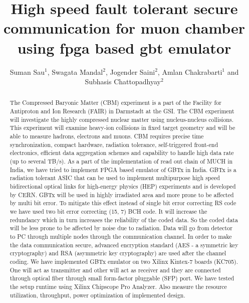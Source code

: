 \documentclass[a4paper]{jpconf}
\begin{document}
\title{High speed fault tolerant secure communication for muon
chamber using fpga based gbt emulator}

\author[1]{Suman Sau$^{1}$, Swagata Mandal$^{2}$, Jogender Saini$^{2}$, Amlan Chakrabarti$^{1}$ and Subhasis Chattopadhyay$^{2}$}
\address{$^{1}$A.K Choudhury School of IT, University of Calcutta $^{2}$Variable Energy Cyclotron Centre, Kolkata, India}

\vspace{-1 pc}
\begin{abstract}
The Compressed Baryonic Matter (CBM) experiment is a part of the Facility for Antiproton and Ion Research (FAIR) in Darmstadt at the GSI. The CBM experiment will investigate the highly compressed nuclear matter using nucleus-nucleus collisions. This experiment will examine heavy-ion collisions in fixed target geometry and will be able to measure hadrons, electrons and muons. CBM requires precise time synchronization, compact hardware, radiation tolerance, self-triggered front-end electronics, efficient data aggregation schemes and capability to handle high data rate (up to several TB/s). 
As a part of the implementation of read out chain of MUCH in India, we have tried to implement FPGA based emulator of GBTx in India. GBTx is a radiation tolerant ASIC that can be used to implement multipurpose high speed bidirectional optical links for high-energy physics (HEP) experiments and is developed by CERN. 
GBTx will be used in highly irradiated area and more prone to be  affected by multi bit error. To mitigate this effect instead of single bit error correcting RS code we have used two bit error correcting (15, 7) BCH code. It will increase the redundancy which in turn increases the reliability of the coded data. So the coded data will be less prone to be affected by noise due to radiation. Data will go from detector to PC through multiple nodes through the communication channel. In order to make the data communication secure, advanced encryption standard (AES - a symmetric key cryptography) and RSA (asymmetric key cryptography) are used after the channel coding. We have implemented GBTx emulator on two Xilinx Kintex-7 boards (KC705). One will act as transmitter and other will act as receiver and they are connected through optical fiber through small form-factor pluggable (SFP) port. We have tested the setup runtime using Xilinx Chipscope Pro Analyzer. Also measure the resource utilization, throughput, power optimization of implemented design. 
\end{abstract}
\vspace{-3 pc}
\end{document}
